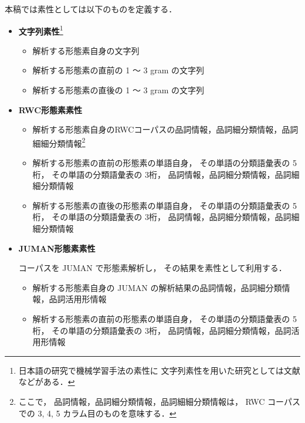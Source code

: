 本稿では素性としては以下のものを定義する．
\begin{itemize}
\item 
  {\bf 文字列素性}\footnote{日本語の研究で機械学習手法の素性に
    文字列素性を用いた研究としては文献\cite{NLP98_nakano,inui:nlken98,murata_nlc2001}などがある．}

  \begin{itemize}
  \item 
    解析する形態素自身の文字列 

  \item 
    解析する形態素の直前の 1 〜 3 gram の文字列

  \item 
    解析する形態素の直後の 1 〜 3 gram の文字列

  \end{itemize}

\item 
  {\bf RWC形態素素性}

  \begin{itemize}
  \item 
    解析する形態素自身のRWCコーパスの品詞情報，品詞細分類情報，品詞細細分類情報\footnote{ここで，
      品詞情報，品詞細分類情報，品詞細細分類情報は，
      RWC コーパスでの 3, 4, 5 カラム目のものを意味する．}

  \item 
    解析する形態素の直前の形態素の単語自身，
    その単語の分類語彙表\cite{bgh}の 5桁，
    その単語の分類語彙表の 3桁，
    品詞情報，品詞細分類情報，品詞細細分類情報

  \item 
    解析する形態素の直後の形態素の単語自身，
    その単語の分類語彙表の 5桁，
    その単語の分類語彙表の 3桁，
    品詞情報，品詞細分類情報，品詞細細分類情報

  \end{itemize}

\item 
  {\bf JUMAN形態素素性}

  コーパスを JUMAN\cite{JUMAN3.6} で形態素解析し，
  その結果を素性として利用する．

  \begin{itemize}
  \item 
    解析する形態素自身の JUMAN の解析結果の品詞情報，品詞細分類情報，品詞活用形情報

  \item 
    解析する形態素の直前の形態素の単語自身，
    その単語の分類語彙表の 5桁，
    その単語の分類語彙表の 3桁，
    品詞情報，品詞細分類情報，品詞活用形情報


\end{itemize}
\end{itemize}
